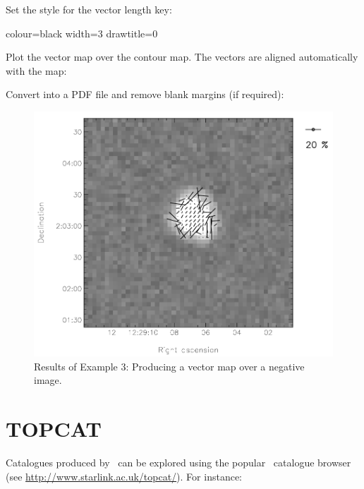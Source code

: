 Set the style for the vector length key:

\begin{terminalv}
colour=black
width=3
drawtitle=0
\end{terminalv}


Plot the vector map over the contour map. The vectors are aligned automatically with the map:

\begin{terminalv}
\end{terminalv}


Convert into a PDF file and remove blank margins (if required):

\begin{terminalv}
\end{terminalv}


\begin{figure}[t!]
\begin{center}
\includegraphics[width=0.75\linewidth]{sc22-kappa-plots-plot3.png}
\caption [Vector map with negative image in polplot]{Results of
Example 3: Producing a vector map over a negative image.\label{fig:kappa-plot3}}
\end{center}
\end{figure}


\section{TOPCAT}

Catalogues produced by \poltwomap\ can be explored using the popular
\topcat\ catalogue browser (see \url{http://www.starlink.ac.uk/topcat/}). For
instance:

